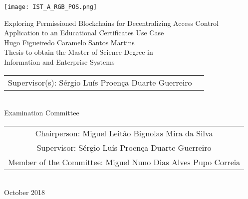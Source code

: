 \texttt{[image: IST\_A\_RGB\_POS.png]}

\begin{center}
    \vspace{2.5cm}

    \vspace{1.5cm}
    {\FontLb Exploring Permissioned Blockchains for Decentralizing Access Control} \\
    \vspace{0.3cm}
    {\FontMn Application to an Educational Certificates Use Case} \\
    \vspace{1.5cm}  
    {\FontMb Hugo Figueiredo Caramelo Santos Martins} \\
    \vspace{1.5cm}
    {\FontSn Thesis to obtain the Master of Science Degree in} \\
    \vspace{0.3cm}
    {\FontLb Information and Enterprise Systems} \\
    \vspace{1.5cm}
    {\FontSn %
        \begin{tabular}{ll}
            Supervisor(s): Sérgio Luís Proença Duarte Guerreiro
        \end{tabular} } \\
    \vspace{1.5cm}
    {\FontMb Examination Committee} \\
    \vspace{0.3cm}
    {\FontSn %
        \begin{tabular}{c}
            Chairperson: Miguel Leitão Bignolas Mira da Silva  \\ 
            Supervisor: Sérgio Luís Proença Duarte Guerreiro \\ 
            Member of the Committee: Miguel Nuno Dias Alves Pupo Correia
        \end{tabular} } \\
    \vspace*{\fill}
    {\FontMb October 2018}
\end{center}